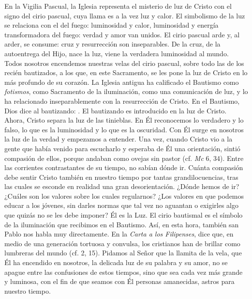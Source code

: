 \begin{body}
En la Vigilia Pascual, la Iglesia representa el misterio de luz de Cristo con el signo del cirio pascual, cuya llama es a la vez luz y calor. El simbolismo de la luz se relaciona con el del fuego: luminosidad y calor, luminosidad y energía transformadora del fuego: verdad y amor van unidos. El cirio pascual arde y, al arder, se consume: cruz y resurrección son inseparables. De la cruz, de la autoentrega del Hijo, nace la luz, viene la verdadera luminosidad al mundo. Todos nosotros encendemos nuestras velas del cirio pascual, sobre todo las de los recién bautizados, a los que, en este Sacramento, se les pone la luz de Cristo en lo más profundo de su corazón. La Iglesia antigua ha calificado el Bautismo como \textit{fotismos}, como Sacramento de la iluminación, como una comunicación de luz, y lo ha relacionado inseparablemente con la resurrección de Cristo. En el Bautismo, Dios dice al bautizando: . El bautizando es introducido en la luz de Cristo. Ahora, Cristo separa la luz de las tinieblas. En Él reconocemos lo verdadero y lo falso, lo que es la luminosidad y lo que es la oscuridad. Con Él surge en nosotros la luz de la verdad y empezamos a entender. Una vez, cuando Cristo vio a la gente que había venido para escucharlo y esperaba de Él una orientación, sintió compasión de ellos, porque andaban como ovejas sin pastor (cf. \textit{Mc} 6, 34). Entre las corrientes contrastantes de su tiempo, no sabían dónde ir. Cuánta compasión debe sentir Cristo también en nuestro tiempo por tantas grandilocuencias, tras las cuales se esconde en realidad una gran desorientación. ¿Dónde hemos de ir? ¿Cuáles son los valores sobre los cuales regularnos? ¿Los valores en que podemos educar a los jóvenes, sin darles normas que tal vez no aguantan o exigirles algo que quizás no se les debe imponer? Él es la Luz. El cirio bautismal es el símbolo de la iluminación que recibimos en el Bautismo. Así, en esta hora, también san Pablo nos habla muy directamente. En la \textit{Carta a los Filipenses}, dice que, en medio de una generación tortuosa y convulsa, los cristianos han de brillar como lumbreras del mundo (cf. 2, 15). Pidamos al Señor que la llamita de la vela, que Él ha encendido en nosotros, la delicada luz de su palabra y su amor, no se apague entre las confusiones de estos tiempos, sino que sea cada vez más grande y luminosa, con el fin de que seamos con Él personas amanecidas, astros para nuestro tiempo.


\end{body}
